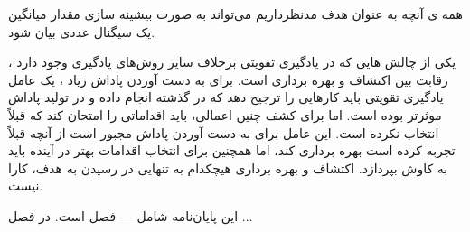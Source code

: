 همه ی آنچه به عنوان هدف مدنظرداریم می‌تواند به صورت بیشینه سازی مقدار میانگین یک سیگنال عددی بیان شود.



یکی از چالش هایی که در یادگیری تقویتی برخلاف سایر روش‌های یادگیری وجود دارد ، رقابت بین اکتشاف و بهره برداری است. برای به دست آوردن پاداش زیاد ، یک عامل یادگیری تقویتی باید کارهایی را ترجیح دهد که در گذشته انجام داده و در تولید پاداش موثرتر بوده است. اما برای کشف چنین اعمالی، باید اقداماتی را امتحان کند که قبلاً انتخاب نکرده است. این عامل برای به دست آوردن پاداش مجبور است از آنچه قبلاً تجربه کرده است بهره برداری کند، اما همچنین برای انتخاب اقدامات بهتر در آینده باید به کاوش بپردازد.
اکتشاف و بهره برداری هیچکدام به تنهایی در رسیدن به هدف، کارا نیست.







این پایان‌نامه شامل --- فصل است. در فصل ...
